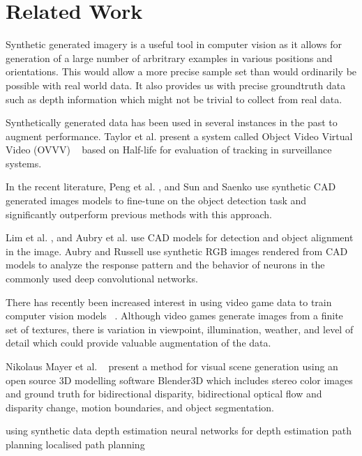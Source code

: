 \section{Related Work}
Synthetic generated imagery is a useful tool in computer vision as it allows for generation of a large number of arbritrary examples in various positions and orientations. This would allow a more precise sample set than would ordinarily be possible with real world data. It also provides us with precise groundtruth data such as depth information which might not be trivial to collect from real data.

Synthetically generated data has been used in several instances in the past to augment performance. Taylor et al. present a system called Object Video Virtual Video (OVVV) ~\cite{Taylor_2007} based on Half-life for evaluation of tracking in surveillance systems. 
 
In the recent literature, Peng et al. , and Sun and Saenko use synthetic CAD generated images models to fine-tune on the object detection task and significantly outperform previous methods with this approach. 

Lim et al. , and Aubry et al. use CAD models for detection and object alignment in the image. Aubry and Russell use synthetic RGB images rendered from CAD models to analyze the response pattern and the behavior of neurons in the commonly used deep convolutional networks.

There has recently been increased interest in using video game data to train computer vision models ~\cite{Shafaei_LS16}. Although video games generate images from a finite set of textures, there is variation in viewpoint, illumination, weather, and level of detail which could provide valuable augmentation of the data. 

Nikolaus Mayer et al. ~\cite{MayerIHFCDB15} present a method for visual scene generation using an open source 3D modelling software Blender3D which includes stereo color images and ground truth for bidirectional disparity, bidirectional optical flow and disparity change, motion boundaries, and object segmentation.

using synthetic data
depth estimation
neural networks for depth estimation
path planning
localised path planning